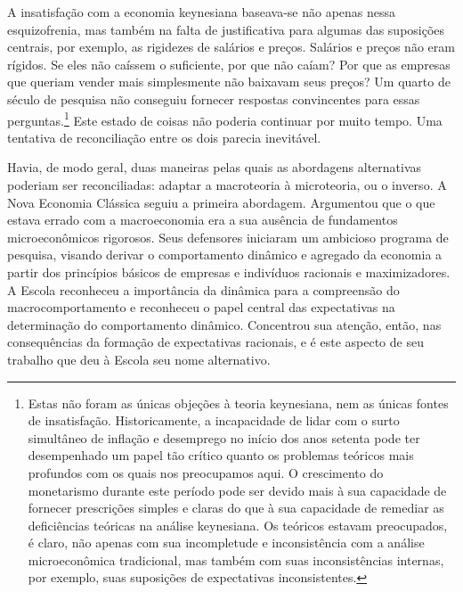 \documentclass[12pt]{article}
\begin{document}
A insatisfação com a economia keynesiana baseava-se não apenas nessa esquizofrenia, mas também na falta de justificativa para algumas das suposições centrais, por exemplo, as rigidezes de salários e preços. Salários e preços não eram rígidos. Se eles não caíssem o suficiente, por que não caíam? Por que as empresas que queriam vender mais simplesmente não baixavam seus preços? Um quarto de século de pesquisa não conseguiu fornecer respostas convincentes para essas perguntas.\footnote{Estas não foram as únicas objeções à teoria keynesiana, nem as únicas fontes de insatisfação. Historicamente, a incapacidade de lidar com o surto simultâneo de inflação e desemprego no início dos anos setenta pode ter desempenhado um papel tão crítico quanto os problemas teóricos mais profundos com os quais nos preocupamos aqui. O crescimento do monetarismo durante este período pode ser devido mais à sua capacidade de fornecer prescrições simples e claras do que à sua capacidade de remediar as deficiências teóricas na análise keynesiana. Os teóricos estavam preocupados, é claro, não apenas com sua incompletude e inconsistência com a análise microeconômica tradicional, mas também com suas inconsistências internas, por exemplo, suas suposições de expectativas inconsistentes.} Este estado de coisas não poderia continuar por muito tempo. Uma tentativa de reconciliação entre os dois parecia inevitável.

Havia, de modo geral, duas maneiras pelas quais as abordagens alternativas poderiam ser reconciliadas: adaptar a macroteoria à microteoria, ou o inverso. A Nova Economia Clássica seguiu a primeira abordagem. Argumentou que o que estava errado com a macroeconomia era a sua ausência de fundamentos microeconômicos rigorosos. Seus defensores iniciaram um ambicioso programa de pesquisa, visando derivar o comportamento dinâmico e agregado da economia a partir dos princípios básicos de empresas e indivíduos racionais e maximizadores. A Escola reconheceu a importância da dinâmica para a compreensão do macrocomportamento e reconheceu o papel central das expectativas na determinação do comportamento dinâmico. Concentrou sua atenção, então, nas consequências da formação de expectativas racionais, e é este aspecto de seu trabalho que deu à Escola seu nome alternativo.
\end{document}

